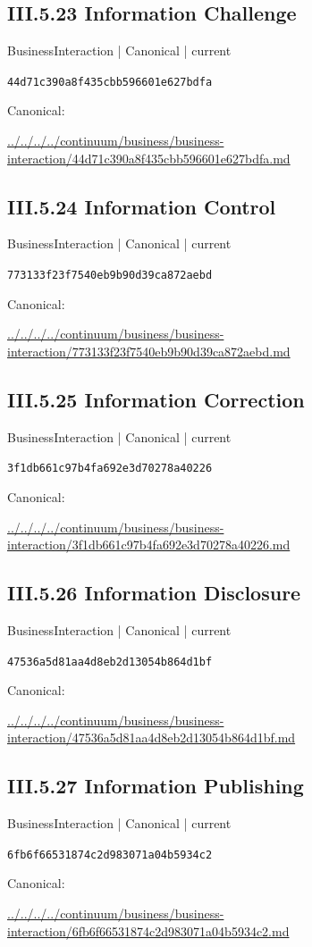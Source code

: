\documentclass[10pt,a4paper]{article}
\begin{document}
\subsection*{III.5.23 Information Challenge}
{\small BusinessInteraction | Canonical | current}\par
\texttt{44d71c390a8f435cbb596601e627bdfa}\par
Canonical: \par
{\footnotesize\url{../../../../continuum/business/business-interaction/44d71c390a8f435cbb596601e627bdfa.md}}\par
\subsection*{III.5.24 Information Control}
{\small BusinessInteraction | Canonical | current}\par
\texttt{773133f23f7540eb9b90d39ca872aebd}\par
Canonical: \par
{\footnotesize\url{../../../../continuum/business/business-interaction/773133f23f7540eb9b90d39ca872aebd.md}}\par
\subsection*{III.5.25 Information Correction}
{\small BusinessInteraction | Canonical | current}\par
\texttt{3f1db661c97b4fa692e3d70278a40226}\par
Canonical: \par
{\footnotesize\url{../../../../continuum/business/business-interaction/3f1db661c97b4fa692e3d70278a40226.md}}\par
\subsection*{III.5.26 Information Disclosure}
{\small BusinessInteraction | Canonical | current}\par
\texttt{47536a5d81aa4d8eb2d13054b864d1bf}\par
Canonical: \par
{\footnotesize\url{../../../../continuum/business/business-interaction/47536a5d81aa4d8eb2d13054b864d1bf.md}}\par
\subsection*{III.5.27 Information Publishing}
{\small BusinessInteraction | Canonical | current}\par
\texttt{6fb6f66531874c2d983071a04b5934c2}\par
Canonical: \par
{\footnotesize\url{../../../../continuum/business/business-interaction/6fb6f66531874c2d983071a04b5934c2.md}}\par
\end{document}
